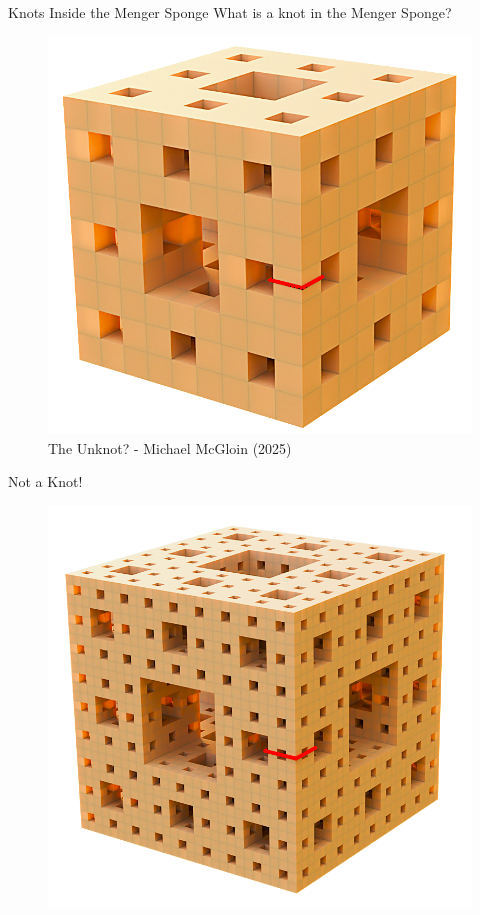 \begin{frame}{Knots Inside the Menger Sponge}
    What is a knot in the Menger Sponge?
    \begin{figure}
        \centering
        \includegraphics[width=0.35\linewidth]{UnknotTwo.png}
        \caption{The Unknot? - Michael McGloin (2025)}
        \label{fig:enter-label}
    \end{figure}
\end{frame}
\begin{frame}{Not a Knot!}
\begin{figure}
    \centering
    \includegraphics[width=0.49\linewidth]{NotAKnot.png}
    \label{fig:enter-label}
\end{figure}
\end{frame}

